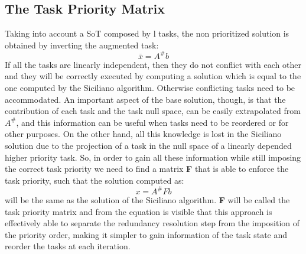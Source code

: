 \documentclass[12pt, a4paper]{article}
\begin{document}
\subsection{The Task Priority Matrix}

Taking into account a SoT composed by l tasks, the non prioritized solution is obtained by inverting the augmented task:
\[
\overline{x} = A^\#b\]
If all the tasks are linearly independent, then they do not conflict with each other and they will be correctly executed by computing a solution which is equal to the one computed by the Siciliano algorithm. Otherwise conflicting tasks need to be accommodated.
An important aspect of the base solution, though, is that the contribution of each task and the task null space, can be easily extrapolated from $A^\#$, and this information can be useful when tasks need to be reordered or for other purposes. On the other hand, all this knowledge is lost in the Siciliano solution due to the projection of a task in the null space of a linearly depended higher priority task. 
So, in order to gain all these information while still imposing the correct task priority we need to find a matrix \textbf{F} that is able to enforce the task priority, such that the solution computed as: 
\begin{equation}
\label{stefano:2}
x = A^\#Fb
\end{equation}
will be the same as the solution of the Siciliano algorithm.
\textbf{F} will be called the task priority matrix and from the equation is visible that this approach is effectively able to separate the redundancy resolution step from the imposition of the priority order, making it simpler to gain information of the task state and reorder the tasks at each iteration.
\end{document}
